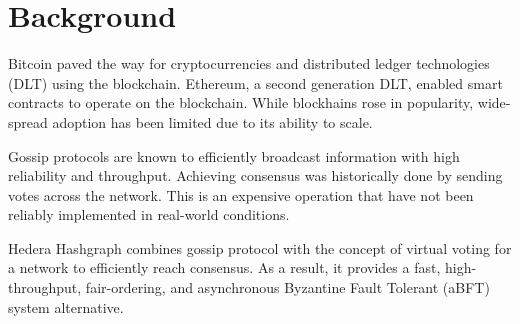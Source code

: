 \section{Background}

Bitcoin\cite{nakamoto2008peer} paved the way for cryptocurrencies and distributed ledger technologies (DLT) using the blockchain. Ethereum\cite{wood2014ethereum}, a second generation DLT, enabled smart contracts to operate on the blockchain. While blockhains rose in popularity, wide-spread adoption has been limited due to its ability to scale. 


Gossip protocols are known to efficiently broadcast information with high reliability and throughput\cite{birman}. Achieving consensus was historically done by sending votes across the network\cite{berman1989towards}. This is an expensive operation that have not been reliably implemented in real-world conditions.

Hedera Hashgraph\cite{baird2016} combines gossip protocol with the concept of virtual voting for a network to efficiently reach consensus. As a result, it provides a fast, high-throughput, fair-ordering, and asynchronous Byzantine Fault Tolerant (aBFT) system alternative.

